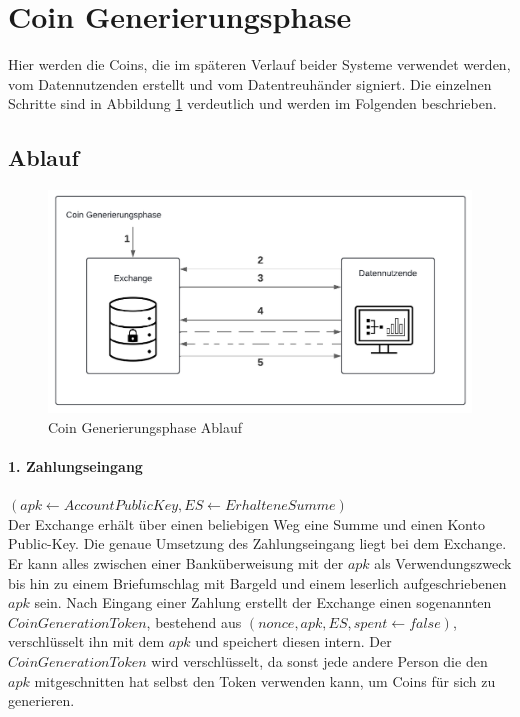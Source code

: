 \documentclass[
	fontsize=12pt,
	headings=small,
	parskip=half,           %
	bibliography=totoc,
	numbers=noenddot,       %
	open=any,               %
]{scrreprt}
\begin{document}
\section{Coin Generierungsphase}
\label{system:coingeneration}
Hier werden die Coins, die im späteren Verlauf beider Systeme verwendet werden, vom Datennutzenden erstellt und vom Datentreuhänder signiert. Die einzelnen Schritte sind in Abbildung \ref{fig:coin-generationphase} verdeutlich und werden im Folgenden beschrieben.
\subsection{Ablauf}
\begin{figure}[H]
    \centering
    \includegraphics[width=0.9\linewidth]{CoinGenerationPhaseDiagramm.pdf}
    \caption{Coin Generierungsphase Ablauf}
    \label{fig:coin-generationphase}
\end{figure}

\paragraph{1. Zahlungseingang} $(apk \leftarrow AccountPublicKey, ES \leftarrow ErhalteneSumme)$\\
Der Exchange erhält über einen beliebigen Weg eine Summe und einen Konto Public-Key. Die genaue Umsetzung des Zahlungseingang liegt bei dem Exchange. Er kann alles zwischen einer Banküberweisung mit der $apk$ als Verwendungszweck bis hin zu einem Briefumschlag mit Bargeld und einem leserlich aufgeschriebenen $apk$ sein. Nach Eingang einer Zahlung erstellt der Exchange einen sogenannten $CoinGenerationToken$, bestehend aus $(nonce, apk, ES, spent \leftarrow false)$, verschlüsselt ihn mit dem $apk$ und speichert diesen intern. Der $CoinGenerationToken$ wird verschlüsselt, da sonst jede andere Person die den $apk$ mitgeschnitten hat selbst den Token verwenden kann, um Coins für sich zu generieren.
\end{document}
